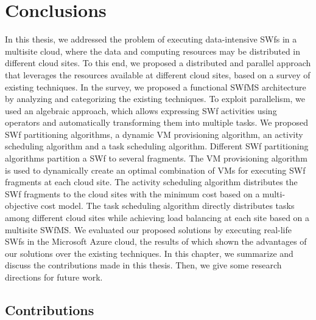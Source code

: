 \chapter{Conclusions} \label{ch:conclusion}

In this thesis, we addressed the problem of executing data-intensive SWfs in a multisite cloud, where the data and computing resources may be distributed in different cloud sites. 
To this end, we proposed a distributed and parallel approach that leverages the resources available at different cloud sites, based on a survey of existing techniques.
In the survey, we proposed a functional SWfMS architecture by analyzing and categorizing the existing techniques. 
To exploit parallelism, we used an algebraic approach, which allows expressing SWf activities using operators and automatically transforming them into multiple tasks.
We proposed SWf partitioning algorithms, a dynamic VM provisioning algorithm, an activity scheduling algorithm and a task scheduling algorithm. 
Different SWf partitioning algorithms partition a SWf to several fragments. 
The VM provisioning algorithm is used to dynamically create an optimal combination of VMs for executing SWf fragments at each cloud site. 
The activity scheduling algorithm distributes the SWf fragments to the cloud sites with the minimum cost based on a multi-objective cost model. 
The task scheduling algorithm directly distributes tasks among different cloud sites while achieving load balancing at each site based on a multisite SWfMS. 
We evaluated our proposed solutions by executing real-life SWfs in the Microsoft Azure cloud, the results of which shown the advantages of our solutions over the existing techniques.
In this chapter, we summarize and discuss the contributions made in this thesis. Then, we give some research directions for future work.

\section{Contributions}

